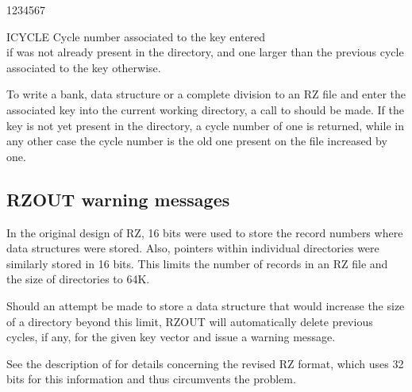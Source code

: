 \Odesc
\begin{DLtt}{1234567}
  \item[ICYCLE]Cycle number associated to the key entered\\
     if 
    was not already present in the directory,
    and one larger than the previous cycle associated to the key otherwise.
\end{DLtt}

To write a bank, data structure or a complete division to an RZ file and enter the
associated key
into the current working directory, a call to  should be made.
If the key is not yet present in the directory, a cycle number of
one is returned, while in any other case the cycle number is the old
one present on the file increased by one.


\subsection*{RZOUT warning messages}

In the original design of RZ, 16 bits were used to store the
record numbers where data structures were stored. Also, pointers
within individual directories were similarly stored in 16 bits.
This limits the number of records in an RZ file and 
the size of directories to 64K. 

Should an attempt be made to store a data structure that
would increase the size of a directory beyond this limit,
RZOUT will automatically delete previous cycles, if any,
for the given key vector and issue a warning message.

See the description of  for details concerning
the revised RZ format, which uses 32 bits for this information
and thus circumvents the problem.

